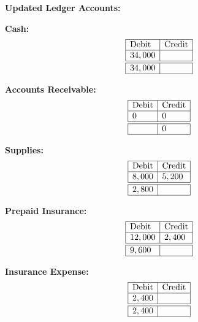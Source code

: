 \documentclass[12pt,a4paper]{book}
\begin{document}
\textbf{Updated Ledger Accounts:}
\begin{multicols}{3}

\vspace{0.5cm}

\textbf{Cash:}
\[
\begin{array}{|l|l|}
\hline
\text{Debit} & \text{Credit} \\
\hline
34,000 & \\
\hline \hline 
34,000  &  \\
\hline
\end{array}
\]

\vspace{0.5cm}

\textbf{Accounts Receivable:}
\[
\begin{array}{|l|l|}
\hline
\text{Debit} & \text{Credit} \\
\hline
0 & 0 \\
\hline \hline
 & 0 \\
\hline
\end{array}
\]

\vspace{0.5cm}

\textbf{Supplies:}
\[
\begin{array}{|l|l|}
\hline
\text{Debit} & \text{Credit} \\
\hline
8,000 & 5,200 \\
\hline \hline 
2,800 &  \\
\hline
\end{array}
\]

\vspace{0.5cm}

\textbf{Prepaid Insurance:}
\[
\begin{array}{|l|l|}
\hline
\text{Debit} & \text{Credit} \\
\hline
12,000 & 2,400 \\
\hline \hline 
9,600 &  \\
\hline
\end{array}
\]

\vspace{0.5cm}

\textbf{Insurance Expense:}
\[
\begin{array}{|l|l|}
\hline
\text{Debit} & \text{Credit} \\
\hline
2,400 & \\
\hline \hline
 2,400 & \\
\hline
\end{array}
\]

\vspace{0.5cm}


\end{multicols}
\end{document}
